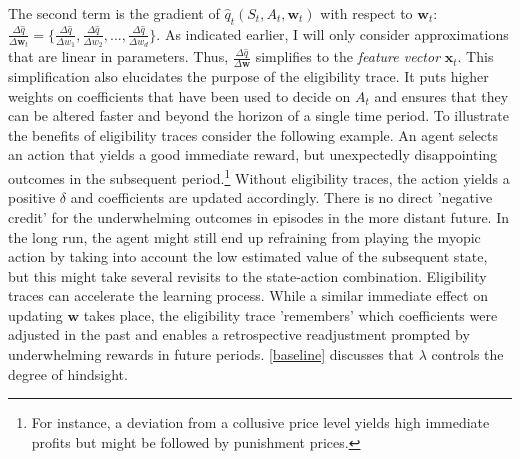 The second term is the gradient of $\hat{q}_t(S_t, A_t, \boldsymbol{w}_t)$ with respect to $\boldsymbol{w}_t$:
$\frac{\Delta \hat{q}}{\Delta \boldsymbol{w}_t} =
\{ \frac{\Delta \hat{q}}{\Delta w_1},
\frac{\Delta \hat{q}}{\Delta w_2},
...,
\frac{\Delta \hat{q}}{\Delta w_d}  \}$. As indicated earlier, I will only consider approximations that are linear in parameters. Thus, $\frac{\Delta \hat{q}}{\Delta \boldsymbol{w}}$ simplifies to the \emph{feature vector} $\boldsymbol{x}_t$. This simplification also elucidates the purpose of the eligibility trace. It puts higher weights on coefficients that have been used to decide on $A_t$ and ensures that they can be altered faster and beyond the horizon of a single time period. To illustrate the benefits of eligibility traces consider the following example. An agent selects an action that yields a good immediate reward, but unexpectedly disappointing outcomes in the subsequent period.\footnote{For instance, a deviation from a collusive price level yields high immediate profits but might be followed by punishment prices.} Without eligibility traces, the action yields a positive $\delta$ and coefficients are updated accordingly. There is no direct 'negative credit' for the underwhelming outcomes in episodes in the more distant future. In the long run, the agent might still end up refraining from playing the myopic action by taking into account the low estimated value of the subsequent state, but this might take several revisits to the state-action combination. Eligibility traces can accelerate the learning process. While a similar immediate effect on updating $\boldsymbol{w}$ takes place, the eligibility trace 'remembers' which coefficients were adjusted in the past and enables a retrospective readjustment prompted by underwhelming rewards in future periods. \autoref{baseline} discusses that $\lambda$ controls the degree of hindsight. 

